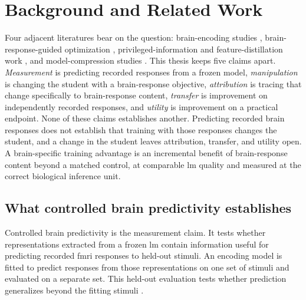 \section{Background and Related Work}
\label{sec:valid-claim}

Four adjacent literatures bear on the question: brain-encoding studies \autocite{oota2023,merlin2024}, brain-response-guided optimization \autocite{moussa2025,negi2025,merlinData2026,vaidya2026}, privileged-information and feature-distillation work \autocite{lopezpaz2016,saadi2025}, and model-compression studies \autocite{oota2026}.
This thesis keeps five claims apart.
\emph{Measurement} is predicting recorded responses from a frozen model, \emph{manipulation} is changing the student with a brain-response objective, \emph{attribution} is tracing that change specifically to brain-response content, \emph{transfer} is improvement on independently recorded responses, and \emph{utility} is improvement on a practical endpoint.
None of these claims establishes another.
Predicting recorded brain responses does not establish that training with those responses changes the student, and a change in the student leaves attribution, transfer, and utility open.
A brain-specific training advantage is an incremental benefit of brain-response content beyond a matched control, at comparable \ac{lm} quality and measured at the correct biological inference unit.

\subsection{What controlled brain predictivity establishes}
\label{sec:controlled-score}

Controlled brain predictivity is the measurement claim.
It tests whether representations extracted from a frozen \ac{lm} contain information useful for predicting recorded \ac{fmri} responses to held-out stimuli.
An encoding model is fitted to predict responses from those representations on one set of stimuli and evaluated on a separate set.
This held-out evaluation tests whether prediction generalizes beyond the fitting stimuli \autocite{oota2023,merlin2024}.

